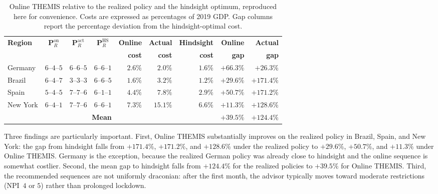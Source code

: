 \documentclass[letterpaper,twoside,11pt]{reviewresponse}
\begin{document}
\begin{table}[h!]
	\centering\footnotesize
	\renewcommand{\arraystretch}{1.05}
	\begin{tabular}{|l|c|c|c|r|r|r|r|r|}
		\hline
		\textbf{Region} & $\bm{P}_R^{\mathrm{on}}$ & $\bm{P}_R^{\mathrm{act}}$ & $\bm{P}_R^{\mathrm{HS}}$ & \textbf{Online} & \textbf{Actual} & \textbf{Hindsight} & \textbf{Online} & \textbf{Actual} \\
		&                          &                         &                     & \textbf{cost}   & \textbf{cost}   & \textbf{cost}      & \textbf{gap}    & \textbf{gap}   \\\hline
		Germany   & $6$--$4$--$5$ & $6$--$6$--$5$ & $6$--$6$--$1$ & $2.6\%$  & $2.0\%$   & $1.6\%$  & $+66.3\%$ & $+26.3\%$ \\
		Brazil    & $6$--$4$--$7$ & $3$--$3$--$3$ & $6$--$6$--$5$ & $1.6\%$   & $3.2\%$  & $1.2\%$  & $+29.6\%$ & $+171.4\%$ \\
		Spain     & $5$--$4$--$5$ & $7$--$7$--$6$ & $6$--$1$--$1$ & $4.4\%$  & $7.8\%$  & $2.9\%$ & $+50.7\%$ & $+171.2\%$ \\
		New York  & $6$--$4$--$1$ & $7$--$7$--$6$ & $6$--$6$--$1$ & $7.3\%$  & $15.1\%$  & $6.6\%$ & $+11.3\%$ & $+128.6\%$ \\\hline
		\multicolumn{4}{|r|}{\textbf{Mean}} & & & & \textbf{$+39.5\%$} & \textbf{$+124.4\%$} \\\hline
	\end{tabular}
	\caption{Online THEMIS relative to the realized policy and the hindsight optimum, reproduced here for convenience. Costs are expressed as percentages of 2019 GDP. Gap columns report the percentage deviation from the hindsight-optimal cost.}
\end{table}

Three findings are particularly important. First, Online THEMIS substantially improves on the realized policy in Brazil, Spain, and New York: the gap from hindsight falls from $+171.4\%$, $+171.2\%$, and $+128.6\%$ under the realized policy to $+29.6\%$, $+50.7\%$, and $+11.3\%$ under Online THEMIS. Germany is the exception, because the realized German policy was already close to hindsight and the online sequence is somewhat costlier. Second, the mean gap to hindsight falls from $+124.4\%$ for the realized policies to $+39.5\%$ for Online THEMIS. Third, the recommended sequences are not uniformly draconian: after the first month, the advisor typically moves toward moderate restrictions (NPI~$4$ or $5$) rather than prolonged lockdown. 
\end{document}
